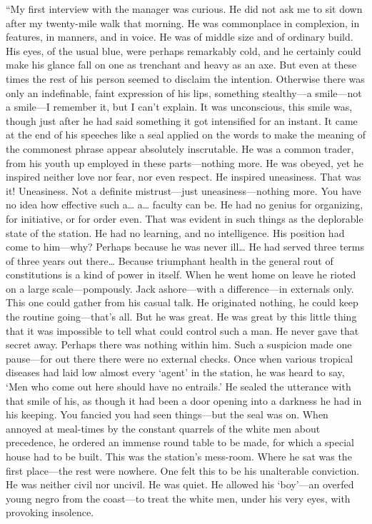 \documentclass[12pt]{report}
\begin{document}
``My first interview with the manager was curious. He did not ask me to
sit down after my twenty-mile walk that morning. He was commonplace in
complexion, in features, in manners, and in voice. He was of middle size
and of ordinary build. His eyes, of the usual blue, were perhaps
remarkably cold, and he certainly could make his glance fall on one as
trenchant and heavy as an axe. But even at these times the rest of his
person seemed to disclaim the intention. Otherwise there was only an
indefinable, faint expression of his lips, something stealthy---a
smile---not a smile---I remember it, but I can't explain. It was
unconscious, this smile was, though just after he had said something it
got intensified for an instant. It came at the end of his speeches like
a seal applied on the words to make the meaning of the commonest phrase
appear absolutely inscrutable. He was a common trader, from his youth up
employed in these parts---nothing more. He was obeyed, yet he inspired
neither love nor fear, nor even respect. He inspired uneasiness. That
was it! Uneasiness. Not a definite mistrust---just uneasiness---nothing
more. You have no idea how effective such a\ldots{} a\ldots{} faculty
can be. He had no genius for organizing, for initiative, or for order
even. That was evident in such things as the deplorable state of the
station. He had no learning, and no intelligence. His position had come
to him---why? Perhaps because he was never ill\ldots{} He had served
three terms of three years out there\ldots{} Because triumphant health
in the general rout of constitutions is a kind of power in itself. When
he went home on leave he rioted on a large scale---pompously. Jack
ashore---with a difference---in externals only. This one could gather
from his casual talk. He originated nothing, he could keep the routine
going---that's all. But he was great. He was great by this little thing
that it was impossible to tell what could control such a man. He never
gave that secret away. Perhaps there was nothing within him. Such a
suspicion made one pause---for out there there were no external checks.
Once when various tropical diseases had laid low almost every `agent' in
the station, he was heard to say, `Men who come out here should have no
entrails.' He sealed the utterance with that smile of his, as though it
had been a door opening into a darkness he had in his keeping. You
fancied you had seen things---but the seal was on. When annoyed at
meal-times by the constant quarrels of the white men about precedence,
he ordered an immense round table to be made, for which a special house
had to be built. This was the station's mess-room. Where he sat was the
first place---the rest were nowhere. One felt this to be his unalterable
conviction. He was neither civil nor uncivil. He was quiet. He allowed
his `boy'---an overfed young negro from the coast---to treat the white
men, under his very eyes, with provoking insolence.
\end{document}
